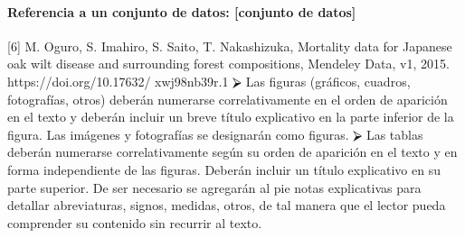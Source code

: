 \paragraph{Referencia a un conjunto de datos: [conjunto de datos]}
[6] M. Oguro, S. Imahiro, S. Saito, T. Nakashizuka, Mortality data for Japanese oak wilt disease and surrounding forest compositions, Mendeley Data, v1, 2015. https://doi.org/10.17632/ xwj98nb39r.1
⮚	Las figuras (gráficos, cuadros, fotografías, otros) deberán numerarse correlativamente en el orden de aparición en el texto y deberán incluir un breve título explicativo en la parte inferior de la figura. Las imágenes y fotografías se designarán como figuras.\newline
⮚	Las tablas deberán numerarse correlativamente según su orden de aparición en el texto y en forma independiente de las figuras. Deberán incluir un título explicativo en su parte superior. De ser necesario se agregarán al pie notas explicativas para detallar abreviaturas, signos, medidas, otros, de tal manera que el lector pueda comprender su contenido sin recurrir al texto.
